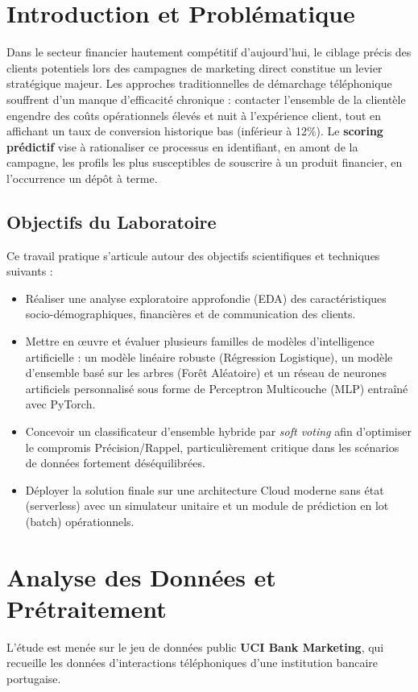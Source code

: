 \documentclass[12pt,a4paper]{article}
\begin{document}
\tableofcontents
\newpage

\section{Introduction et Problématique}
Dans le secteur financier hautement compétitif d'aujourd'hui, le ciblage précis des clients potentiels lors des campagnes de marketing direct constitue un levier stratégique majeur. Les approches traditionnelles de démarchage téléphonique souffrent d'un manque d'efficacité chronique : contacter l'ensemble de la clientèle engendre des coûts opérationnels élevés et nuit à l'expérience client, tout en affichant un taux de conversion historique bas (inférieur à 12\%). Le \textbf{scoring prédictif} vise à rationaliser ce processus en identifiant, en amont de la campagne, les profils les plus susceptibles de souscrire à un produit financier, en l'occurrence un dépôt à terme.

\subsection{Objectifs du Laboratoire}
Ce travail pratique s'articule autour des objectifs scientifiques et techniques suivants :
\begin{itemize}
    \item Réaliser une analyse exploratoire approfondie (EDA) des caractéristiques socio-démographiques, financières et de communication des clients.
    \item Mettre en œuvre et évaluer plusieurs familles de modèles d'intelligence artificielle : un modèle linéaire robuste (Régression Logistique), un modèle d'ensemble basé sur les arbres (Forêt Aléatoire) et un réseau de neurones artificiels personnalisé sous forme de Perceptron Multicouche (MLP) entraîné avec PyTorch.
    \item Concevoir un classificateur d'ensemble hybride par \emph{soft voting} afin d'optimiser le compromis Précision/Rappel, particulièrement critique dans les scénarios de données fortement déséquilibrées.
    \item Déployer la solution finale sur une architecture Cloud moderne sans état (serverless) avec un simulateur unitaire et un module de prédiction en lot (batch) opérationnels.
\end{itemize}

\section{Analyse des Données et Prétraitement}
L'étude est menée sur le jeu de données public \textbf{UCI Bank Marketing}, qui recueille les données d'interactions téléphoniques d'une institution bancaire portugaise.
\end{document}
